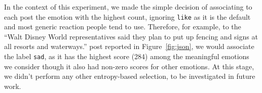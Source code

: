 \documentclass[11pt]{article}
\begin{document}
In the context of this experiment, we made the simple decision of associating to each post the emotion with the highest count, ignoring \texttt{like} as it is the default and most generic reaction people tend to use. Therefore, for example, to the ``Walt Disney World representatives said 
  they plan to put up fencing and signs at all resorts 
  and waterways.'' post reported in Figure~\ref{fig:json}, 
  we would associate the label \texttt{sad}, as it has the highest score (284) among the meaningful emotions we consider though it also had non-zero scores for other emotions. At this stage, we didn't perform any other entropy-based selection, to be investigated in future work.






%        
\end{document}
